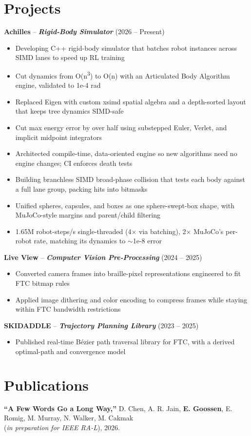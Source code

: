 \documentclass[letterpaper,11pt]{article}
\newcommand{\role}[4]{\textbf{#1} #4 \textbf{\textit{#2}} (#3)}
\begin{document}
\section{Projects}
\role{Achilles}{Rigid-Body Simulator}{2026 -- Present}{--}
\begin{itemize}
  \item Developing C++ rigid-body simulator that batches robot instances across SIMD lanes to speed up RL training
  \item Cut dynamics from O(n\textsuperscript{3}) to O(n) with an Articulated Body Algorithm engine, validated to 1e-4 rad
  \item Replaced Eigen with custom xsimd spatial algebra and a depth-sorted layout that keeps tree dynamics SIMD-safe
  \item Cut max energy error by over half using substepped Euler, Verlet, and implicit midpoint integrators
  \item Architected compile-time, data-oriented engine so new algorithms need no engine changes; CI enforces death tests
  \item Building branchless SIMD broad-phase collision that tests each body against a full lane group, packing hits into bitmasks
  \item Unified spheres, capsules, and boxes as one sphere-swept-box shape, with MuJoCo-style margins and parent/child filtering
  \item 1.65M robot-steps/s single-threaded (4$\times$ via batching), 2$\times$ MuJoCo's per-robot rate, matching its dynamics to $\sim$1e-8 error
\end{itemize}

\role{Live View}{Computer Vision Pre-Processing}{2024 -- 2025}{--}
\begin{itemize}
  \item Converted camera frames into braille-pixel representations engineered to fit FTC bitmap rules
  \item Applied image dithering and color encoding to compress frames while staying within FTC bandwidth restrictions
\end{itemize}

\role{SKIDADDLE}{Trajectory Planning Library}{2023 -- 2025}{--}
\begin{itemize}
  \item Published real-time B\'ezier path traversal library for FTC, with a derived optimal-path and convergence model
\end{itemize}

\section{Publications}
\textbf{``A Few Words Go a Long Way,''} D. Chen, A. R. Jain, \textbf{E. Goossen}, E. Romig, M. Murray, N. Walker, M. Cakmak\\
(\textit{in preparation for IEEE RA-L}), 2026.
\end{document}
